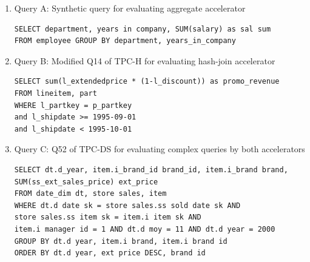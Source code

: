 \documentclass{article}
\begin{document}

\begin{enumerate}

\item Query A: Synthetic query for evaluating aggregate accelerator 
\begin{verbatim}
SELECT department, years in company, SUM(salary) as sal sum
FROM employee GROUP BY department, years_in_company
\end{verbatim}

\item Query B: Modified Q14 of TPC-H for evaluating hash-join accelerator
\begin{verbatim}
SELECT sum(l_extendedprice * (1-l_discount)) as promo_revenue
FROM lineitem, part
WHERE l_partkey = p_partkey
and l_shipdate >= 1995-09-01 
and l_shipdate < 1995-10-01
\end{verbatim}

\item Query C: Q52 of TPC-DS for evaluating complex queries by both accelerators
\begin{verbatim}
SELECT dt.d_year, item.i_brand_id brand_id, item.i_brand brand,
SUM(ss_ext_sales_price) ext_price
FROM date_dim dt, store sales, item
WHERE dt.d date sk = store sales.ss sold date sk AND
store sales.ss item sk = item.i item sk AND
item.i manager id = 1 AND dt.d moy = 11 AND dt.d year = 2000
GROUP BY dt.d year, item.i brand, item.i brand id
ORDER BY dt.d year, ext price DESC, brand id
\end{verbatim}
\end{enumerate}



\end{document}
